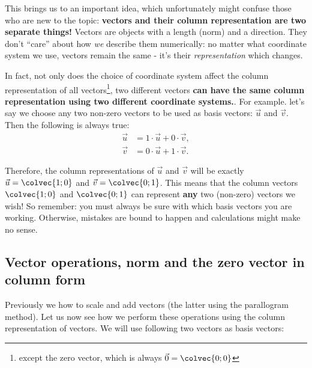 This brings us to an important idea, which unfortunately might confuse those who are new to the topic: \textbf{vectors and their column representation are two separate things!} Vectors are objects with a length (norm) and a direction. They don't ``care'' about how \textit{we} describe them numerically: no matter what coordinate system we use, vectors remain the same - it's their \textit{representation} which changes.

In fact, not only does the choice of coordinate system affect the column representation of all vectors\footnote{except the zero vector, which is always $\vec{0}=\colvec{0;0}$}, two different vectors \textbf{can have the same column representation using two different coordinate systems.}. For example. let's say we choose any two non-zero vectors to be used as basis vectors: $\vec{u}$ and $\vec{v}$. Then the following is always true:
\begin{align*}
  \vec{u} &= 1\cdot\vec{u} + 0\cdot\vec{v},\\
  \vec{v} &= 0\cdot\vec{u} + 1\cdot\vec{v}.
\end{align*}

Therefore, the column representations of $\vec{u}$ and $\vec{v}$ will be exactly $\vec{u}=\colvec{1;0}$ and $\vec{v}=\colvec{0;1}$. This means that the column vectors $\colvec{1;0}$ and $\colvec{0;1}$ can represent \textbf{any} two (non-zero) vectors we wish! So remember: you must always be sure with which basis vectors you are working. Otherwise, mistakes are bound to happen and calculations might make no sense.


\subsection{Vector operations, norm and the zero vector in column form}
Previously we how to scale and add vectors (the latter using the parallogram method). Let us now see how we perform these operations using the column representation of vectors. We will use following two vectors as basis vectors:

\begin{center}
\end{center}

